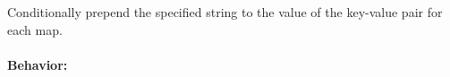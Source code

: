 Conditionally prepend the specified string to the value of the key-value pair
for each map.

\paragraph{Behavior:}
\begin{itemize}[noitemsep]



\end{itemize}
